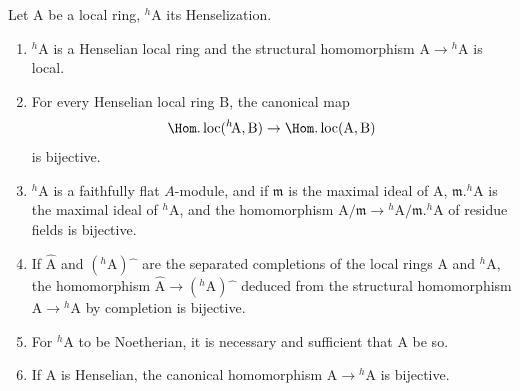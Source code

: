 \begin{theorem}[18.6.6]
\label{IV.18.6.6}
Let $\mathrm{A}$ be a local ring, ${}^h\!\mathrm{A}$ its Henselization.
\begin{enumerate}[label=\emph{\roman*)}]
  \item ${}^h\!\mathrm{A}$ is a Henselian local ring and the structural homomorphism $\mathrm{A}\to{}^h\!\mathrm{A}$ is local.
  \item For every Henselian local ring $\mathrm{B}$, the canonical map
  \[
    \Hom.\operatorname{loc}({}^h\!\mathrm{A},\mathrm{B})\to\Hom.\operatorname{loc}(\mathrm{A},\mathrm{B})
  \]
  is bijective.
  \item ${}^h\!\mathrm{A}$ is a faithfully flat $A$-module, and if $\mathfrak{m}$ is the maximal ideal of $\mathrm{A}$, $\mathfrak{m}.{}^h\!\mathrm{A}$ is the maximal ideal of ${}^h\!\mathrm{A}$, and the homomorphism $\mathrm{A}/\mathfrak{m}\to{}^h\!\mathrm{A}/\mathfrak{m}.{}^h\!\mathrm{A}$ of residue fields is bijective.
  \item If $\hat{\mathrm{A}}$ and $({}^h\!\mathrm{A})\hat{\phantom{x}}$ are the separated completions of the local rings $\mathrm{A}$ and ${}^h\!\mathrm{A}$, the homomorphism $\hat{\mathrm{A}}\to({}^h\!\mathrm{A})\hat{\phantom{x}}$ deduced from the structural homomorphism $\mathrm{A}\to{}^h\!\mathrm{A}$ by completion is bijective.
  \item For ${}^h\!\mathrm{A}$ to be Noetherian, it is necessary and sufficient that A be so.
  \item If A is Henselian, the canonical homomorphism $\mathrm{A}\to{}^h\!\mathrm{A}$ is bijective.
\end{enumerate}
\end{theorem}

